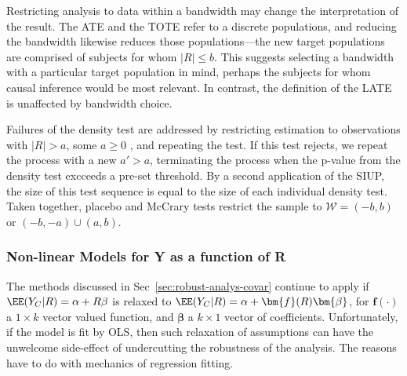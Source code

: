 Restricting analysis to data within a bandwidth may change the
interpretation of the result. The ATE and the
TOTE refer to a discrete populations, and reducing the bandwidth likewise
reduces those populations---the new target populations are comprised of
subjects for whom $|R|\le b$.
This suggests selecting a bandwidth with a particular target
population in mind, perhaps the subjects for whom causal inference
would be most relevant.
In contrast, the definition of the LATE is unaffected by bandwidth
choice.


Failures of the density test are addressed by restricting
estimation to observations with $|R|>a$, some $a \geq 0$
\citep[e.g.,][]{barrecaetal2011birthweightRDD,eggers2014validity}, and
repeating the test.
If this test rejects, we repeat the process with a new $a'>a$,
terminating the process when the p-value from the density test
excceeds a pre-set threshold.
By a second application of the SIUP,
the size of this test sequence is equal to the size of each individual
density test.
Taken together, placebo and McCrary tests restrict the sample to
$\mathcal{W} = (-b, b)$ or  $(-b, -a) \cup (a, b)$.

\subsubsection{Non-linear Models for Y as a function of R}\label{sec:nonlinear}
The methods discussed in Sec~\ref{sec:robust-analys-covar} continue to
apply if $\EE (Y_{C}| R) = \alpha + R\beta$ is relaxed to
$\EE (Y_{C}| R) = \alpha + \bm{f}(R)\bm{\beta}$, for
$\bm{f}(\cdot)$ a $1 \times k$ vector valued function, and
$\bm{\beta}$ a $k \times 1$ vector of coefficients.
Unfortunately, if the model is fit by OLS, then such relaxation of assumptions can have the unwelcome
side-effect of undercutting the robustness of the analysis.  The
reasons have to do with mechanics of regression fitting.


